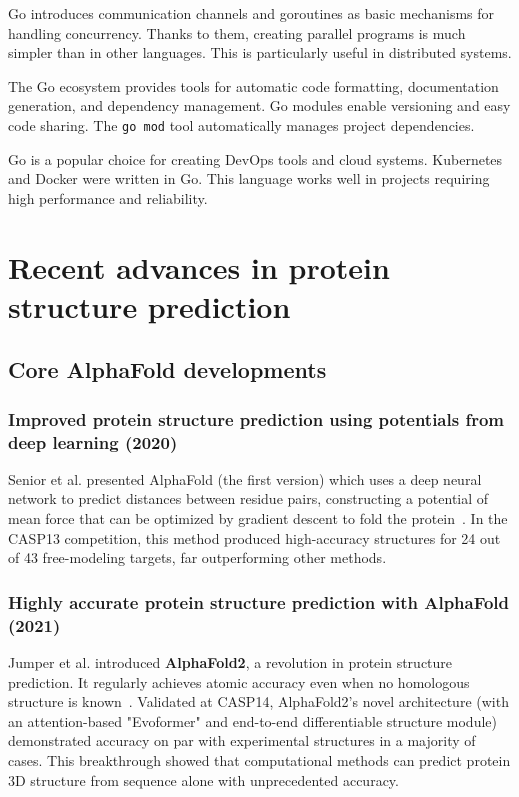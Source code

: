 Go introduces communication channels and goroutines as basic mechanisms for handling concurrency.
Thanks to them, creating parallel programs is much simpler than in other languages.
This is particularly useful in distributed systems.

The Go ecosystem provides tools for automatic code formatting, documentation generation, and dependency management.
Go modules enable versioning and easy code sharing.
The \texttt{go mod} tool automatically manages project dependencies.

Go is a popular choice for creating DevOps tools and cloud systems.
Kubernetes and Docker were written in Go. This language works well in projects requiring high performance and reliability.


\section{Recent advances in protein structure prediction}

\subsection{Core AlphaFold developments}

\subsubsection{Improved protein structure prediction using potentials from deep learning (2020)}

Senior et al.
presented AlphaFold (the first version) which uses a deep neural network to predict distances between residue pairs, constructing a potential of mean force that can be optimized by gradient descent to fold the protein~\cite{Senior2020AlphaFold}.
In the CASP13 competition, this method produced high-accuracy structures for 24 out of 43 free-modeling targets, far outperforming other methods.

\subsubsection{Highly accurate protein structure prediction with AlphaFold (2021)}

Jumper et al.
introduced \textbf{AlphaFold2}, a revolution in protein structure prediction.
It regularly achieves atomic accuracy even when no homologous structure is known~\cite{Jumper2021AlphaFold2}.
Validated at CASP14, AlphaFold2's novel architecture (with an attention-based "Evoformer" and end-to-end differentiable structure module) demonstrated accuracy on par with experimental structures in a majority of cases.
This breakthrough showed that computational methods can predict protein 3D structure from sequence alone with unprecedented accuracy.

